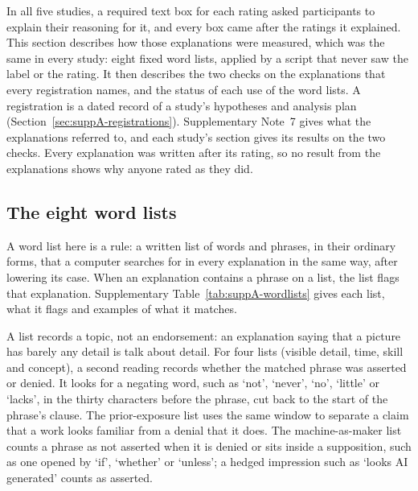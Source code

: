 \label{sec:suppA-text}

In all five studies, a required text box for each rating asked participants to explain their reasoning for it, and every box came after the ratings it explained. This section describes how those explanations were measured, which was the same in every study: eight fixed word lists, applied by a script that never saw the label or the rating. It then describes the two checks on the explanations that every registration names, and the status of each use of the word lists. A registration is a dated record of a study's hypotheses and analysis plan (Section~\ref{sec:suppA-registrations}). Supplementary Note~7 gives what the explanations referred to, and each study's section gives its results on the two checks. Every explanation was written after its rating, so no result from the explanations shows why anyone rated as they did.

\subsection*{The eight word lists}

A word list here is a rule: a written list of words and phrases, in their ordinary forms, that a computer searches for in every explanation in the same way, after lowering its case. When an explanation contains a phrase on a list, the list flags that explanation. Supplementary Table~\ref{tab:suppA-wordlists} gives each list, what it flags and examples of what it matches.



A list records a topic, not an endorsement: an explanation saying that a picture has barely any detail is talk about detail. For four lists (visible detail, time, skill and concept), a second reading records whether the matched phrase was asserted or denied. It looks for a negating word, such as `not', `never', `no', `little' or `lacks', in the thirty characters before the phrase, cut back to the start of the phrase's clause. The prior-exposure list uses the same window to separate a claim that a work looks familiar from a denial that it does. The machine-as-maker list counts a phrase as not asserted when it is denied or sits inside a supposition, such as one opened by `if', `whether' or `unless'; a hedged impression such as `looks AI generated' counts as asserted.

